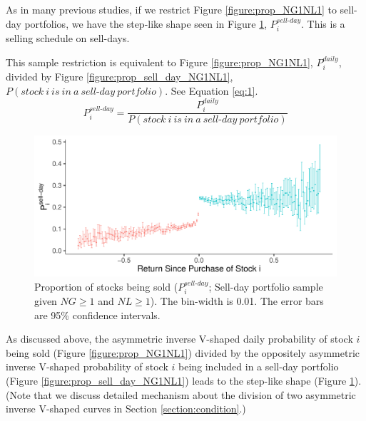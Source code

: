 \documentclass[11pt, a4paper]{article}
\begin{document}
As in many previous studies, if we restrict Figure \ref{figure:prop_NG1NL1} to sell-day portfolios, we have the step-like shape seen in Figure \ref{figure:prop_sell_days_NG1NL1}, $P^{sell\mbox{-}day}_{i}$. This is a selling schedule on sell-days.

This sample restriction is equivalent to Figure \ref{figure:prop_NG1NL1}, $P^{daily}_{i}$, divided by Figure \ref{figure:prop_sell_day_NG1NL1}, $P(stock~i~is~in~a~sell\mbox{-}day~portfolio)$. See Equation \ref{eq:1}.\\

\begin{equation}
	\label{eq:1}
P^{sell\mbox{-}day}_{i} = \frac{P^{daily}_{i}}{P(stock~i~is~in~a~sell\mbox{-}day~portfolio)}
\end{equation}
\small
\normalsize


\begin{figure}[H]
	\centering
	\includegraphics[width=0.8\columnwidth]{barc_schedule_sell_day_NG1_NL1_3.pdf}
	\caption{\small Proportion of stocks being sold ($P^{sell\mbox{-}day}_{i}$; Sell-day portfolio sample given $NG\geq1$ and $NL\geq1$). The bin-width is 0.01. The error bars are 95\% confidence intervals.}
	\label{figure:prop_sell_days_NG1NL1}
\end{figure}

As discussed above, the asymmetric inverse V-shaped daily probability of stock $i$ being sold (Figure \ref{figure:prop_NG1NL1}) divided by the oppositely asymmetric inverse V-shaped probability of stock $i$ being included in a sell-day portfolio (Figure \ref{figure:prop_sell_day_NG1NL1}) leads to the step-like shape (Figure \ref{figure:prop_sell_days_NG1NL1}). (Note that we discuss detailed mechanism about the division of two asymmetric inverse V-shaped curves in Section \ref{section:condition}.) \\
\end{document}
